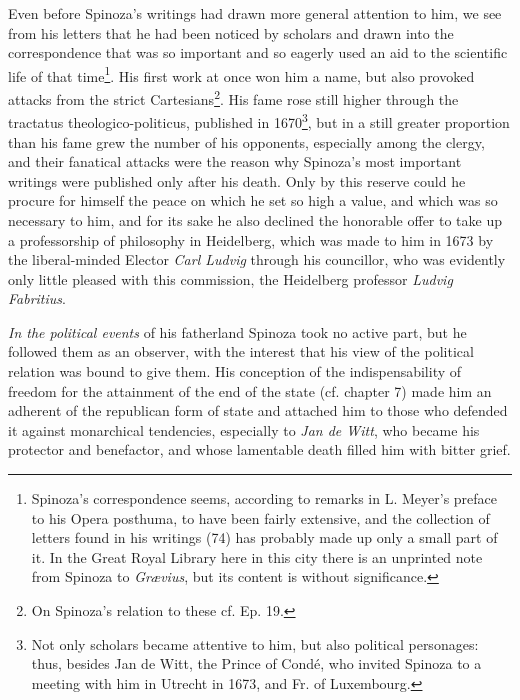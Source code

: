 \documentclass[12pt,a4paper,openany]{book}
\newcommand{\opage}[1]{\marginnote{\footnotesize\textit{[#1]}}}
\begin{document}
Even before Spinoza's writings had drawn more general attention to him,
we see from his letters that he had been noticed by scholars and drawn
into the correspondence that was so important and so eagerly used an aid
to the scientific life of that time\footnote{Spinoza's correspondence
seems, according to remarks in L. Meyer's preface to his Opera posthuma,
to have been fairly extensive, and the collection of letters found in his
writings (74) has probably made up only a small part of it. In the Great
Royal Library here in this city there is an unprinted note from Spinoza
to \emph{Grævius}, but its content is without significance.}. His first
work at once won him a name, but also provoked attacks from the strict
Cartesians\footnote{On Spinoza's relation to these cf. Ep. 19.}. His
fame rose still higher through the tractatus theologico-politicus,
published in 1670\footnote{Not only scholars became attentive to him,
but also political personages: thus, besides Jan de Witt, the Prince of
Condé, who invited Spinoza to a meeting with him in Utrecht in 1673, and
Fr. of Luxembourg.}, but in a still greater proportion than his fame
grew the number of his opponents, especially among the clergy, and
their fanatical attacks were the reason why Spinoza's most important
writings were published only after his death. Only by this reserve
could he procure for himself the peace on which he set so high a value,
and which was so necessary to him, and for its sake he also declined the
honorable offer to take up a professorship of philosophy in Heidelberg,
which was made to him in 1673 by the liberal-minded Elector \emph{Carl
Ludvig} through his councillor, who was evidently only
\opage{33}little pleased with this commission, the Heidelberg professor
\emph{Ludvig Fabritius}.

\emph{In the political events} of his fatherland Spinoza took no active
part, but he followed them as an observer, with the interest that his
view of the political relation was bound to give them. His conception of
the indispensability of freedom for the attainment of the end of the
state (cf. chapter 7) made him an adherent of the republican form of
state and attached him to those who defended it against monarchical
tendencies, especially to \emph{Jan de Witt}, who became his protector
and benefactor, and whose lamentable death filled him with bitter grief.
\end{document}
